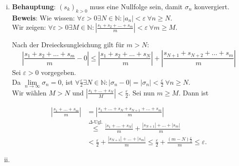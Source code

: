 \documentclass[12pt,a4paper]{article}
\begin{document}
\begin{enumerate}[(i)]
    \item \textbf{Behauptung}: $(s_k)_{k>0}$ muss eine Nullfolge sein, damit $\sigma_n$ konvergiert.\\

    \textbf{Beweis}:
    Wie wissen: $\forall \varepsilon > 0 \exists N \in \mathbb{N}: |a_n| < \varepsilon\ \forall n \geq N.$\\
    Wir zeigen: $\forall \varepsilon > 0 \exists M \in \mathbb{N}: \left|\frac{s_1 + s_2 + \ldots + s_m}{m}\right| < \varepsilon\ \forall m \geq M.$

    Nach der Dreiecksungleichung gilt für $m > N$:
    $$\left|\frac{s_1 + s_2 + \ldots + s_m}{m} - 0\right| \leq \left|\frac{s_1 + s_2 + \ldots + s_N}{m}\right| + \left|\frac{s_{N+1} + s_{N+2} + \ldots + s_m}{m}\right|$$
    Sei $\varepsilon > 0$ vorgegeben.\\
    Da $\lim\limits_{n \to \infty} \sigma_n = 0$, ist $\forall \frac{\varepsilon}{2} \exists N \in \mathbb{N}: |\sigma_n - 0| = |\sigma_n| < \frac{\varepsilon}{2}\ \forall n \geq N.$\\
    Wir wählen $M > N$ und $\left|\frac{s_1 + \ldots + s_N}{M}\right| < \frac{\varepsilon}{2}.$
    Sei nun $m \geq M$. Dann ist

    \begin{align*}
        \left|\frac{s_1 + \ldots + s_m}{m}\right| &= \left|\frac{s_1 + \ldots + s_N + s_{N+1} + \ldots + s_m}{m}\right|\\
        &\overset{\Delta\text{-Ugl.}}{\leq} \frac{|s_1 + \ldots + s_N|}{m} + \frac{|s_{N+1}| + \ldots + |s_m|}{m}\\
        &< \frac{\varepsilon}{2} + \frac{|s_{N+1}| + \ldots + |s_m|}{m}
        \leq \frac{\varepsilon}{2} + \frac{(m-N)\frac{\varepsilon}{2}}{m}
        \leq \varepsilon.
    \end{align*}

    \item


\end{enumerate}
\end{document}
